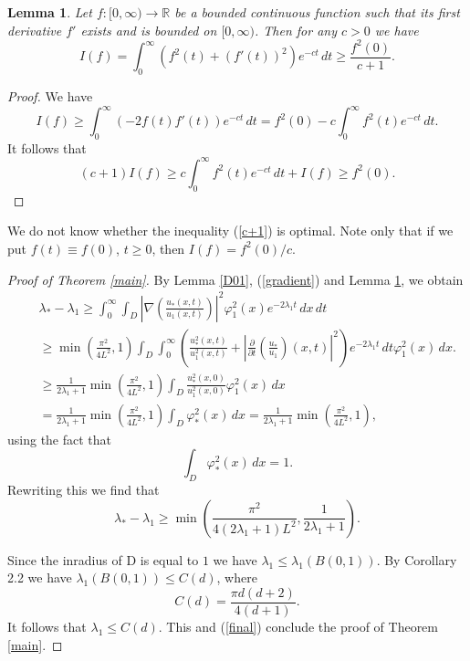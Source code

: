 \documentclass[11pt,leqno]{article}
\newtheorem{lem}{Lemma}[section]
\theoremstyle{definition}
\newcommand{\R}{\mathbb{R}}
\numberwithin{equation}{section}
\begin{document}
\begin{lem}
\label{derivative}
Let $f : [0,\infty) \to \R$ be a bounded continuous function such that its first derivative
 $f'$ exists and is bounded on $[0,\infty)$. Then for any $c > 0$ we have
\begin{equation}
\label{c+1}
I(f) = \int_{0}^{\infty} (f^{2}(t) + (f'(t))^{2}) e^{-c t} \, dt \ge \frac{f^{2}(0)}{c + 1}.
\end{equation}
\end{lem}
\begin{proof}
We have
$$
I(f) \ge \int_{0}^{\infty} (-2 f(t) f'(t)) e^{-c t} \, dt 
= f^2(0) - c \int_{0}^{\infty} f^{2}(t) e^{-c t} \, dt.
$$
It follows that
$$
(c + 1) I(f) \ge c \int_{0}^{\infty} f^{2}(t) e^{-c t} \, dt + I(f) \ge f^2(0).
$$
\end{proof}
We do not know whether the inequality (\ref{c+1}) is optimal. 
Note only that if we put $f(t) \equiv f(0)$, $t \ge 0$,  then $I(f) = f^2(0)/c$.

\begin{proof}[Proof of Theorem \ref{main}]
By Lemma \ref{D01}, (\ref{gradient}) and Lemma \ref{derivative},   we obtain  
\begin{eqnarray*}
&& \lambda_{*} - \lambda_{1} \ge 
 \int_{0}^{\infty} 
\int_{D} \left|\nabla \left(\frac{u_{*}(x,t)}{u_{1}(x,t)} \right) \right|^{2} 
\varphi_{1}^{2}(x) e^{- 2 \lambda_{1} t} \, dx \, dt\\
&& \ge  \min \left( \frac{\pi^{2}}{4 L^{2}},1 \right) 
 \int_{D}  \int_{0}^{\infty} 
\left( \frac{u_*^{2}(x,t)}{u_1^{2}(x,t)} + 
\left| \frac{\partial}{\partial t}\left(\frac{u_*}{u_1}\right)(x,t)\right|^{2} \right) 
e^{- 2 \lambda_{1} t} \, dt
 \varphi_{1}^{2}(x) \, dx. \\
&& \ge \frac{1}{2 \lambda_1 + 1} \min \left( \frac{\pi^{2}}{4 L^{2}},1 \right) 
\int_{D}  \frac{u_{*}^{2}(x,0)}{u_{1}^{2}(x,0)}  \varphi_{1}^{2}(x) \, dx \\
&&
= \frac{1}{2 \lambda_1 + 1}
\min \left( \frac{\pi^{2}}{4 L^{2}},1 \right)
 \int_{D} \varphi_{*}^{2}(x) \, dx = \frac{1}{2 \lambda_1 + 1}
\min \left( \frac{\pi^{2}}{4 L^{2}},1 \right), 
\end{eqnarray*}
using the fact that 
$$\int_{D} \varphi_{*}^{2}(x) \, dx =1.$$
Rewriting this we find that 
\begin{equation}
\label{final}
\lambda_* - \lambda_1 \ge  
 \min \left( \frac{\pi^2}{4  (2 \lambda_1 + 1) L^2}, \frac{1}{2 \lambda_1 +1} \right).
\end{equation}

Since the inradius of D is equal to $1$ we have $\lambda_1  \le \lambda_1(B(0,1))$. 
By Corollary 2.2 \cite{BK} we have $\lambda_1(B(0,1)) \le C(d)$, where
$$
C(d) = \frac{\pi d (d +2)}{4 (d + 1)}.
$$
It follows that $\lambda_1 \le C(d)$.  This and 
 (\ref{final}) conclude the proof of Theorem \ref{main}. 
\end{proof}
\end{document}
